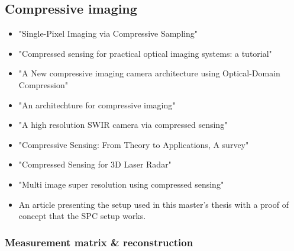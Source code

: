 \subsection{Compressive imaging}
\begin{itemize}
\item \cite{article:single_pixel_im_cs} "Single-Pixel Imaging via Compressive Sampling"
\item \cite{article:cs_for_prac_ios_a_tut} "Compressed sensing for practical optical imaging systems: a tutorial"

\item \cite{article:a_new_ci_arc} "A New compressive imaging camera architecture using Optical-Domain Compression"

\item \cite{article:an_Arcitecture_for_CI} "An architechture for compressive imaging"

\item \cite{article:a_high_res_swir} "A high resolution SWIR camera via compressed sensing"

\item \cite{article:cs_for_prac_ios_a_tut} "Compressive Sensing: From Theory to Applications, A survey"

\item \cite{mt:EF} "Compressed Sensing for 3D Laser Radar"  

\item \cite{article:misuperres} "Multi image super resolution using compressed sensing" 

\item \cite{article:foiSPIS} An article presenting the setup used in this master's thesis with a proof of concept that the SPC setup works. 
	
\end{itemize}
    
\subsubsection{Measurement matrix \& reconstruction}

